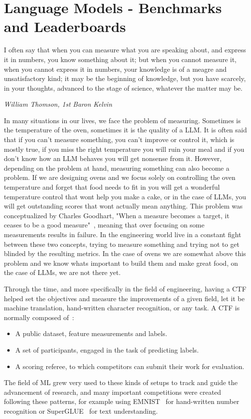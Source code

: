 \section{Language Models - Benchmarks and Leaderboards}\label{sec:b}


\epigraph{I often say that when you can measure what you are speaking about, and express it in numbers, you know something about it; but when you cannot measure it, when you cannot express it in numbers, your knowledge is of a meagre and unsatisfactory kind; it may be the beginning of knowledge, but you have scarcely, in your thoughts, advanced to the stage of science, whatever the matter may be.}{\textit{William Thomson, 1st Baron Kelvin}}

In many situations in our lives, we face the problem of measuring. Sometimes is the temperature of the oven, sometimes it is the quality of a \gls{LLM}. It is often said that if you can't measure something, you can't improve or control it, which is mostly true, if you miss the right temperature you will ruin your meal and if you don't know how an \gls{LLM} behaves you will get nonsense from it. 
However, depending on the problem at hand, measuring something can also become a problem. If we are designing ovens and we focus solely on controlling the oven temperature and forget that food needs to fit in you will get a wonderful temperature control that wont help you make a cake, or in the case of \glspl{LLM}, you will get outstanding scores that wont actually mean anything. This problem was conceptualized by Charles Goodhart, "When a measure becomes a target, it ceases to be a good measure"~\cite{strathern1997improving}, meaning that over focusing on some measurements results in failure.
In the engineering world live in a constant fight between these two concepts, trying to measure something and trying not to get blinded by the resulting metrics. In the case of ovens we are somewhat above this problem and we know whats important to build them and make great food, on the case of \glspl{LLM}, we are not there yet.


Through the time, and more specifically in the field of engineering, having a \gls{CTF} helped set the objectives and measure the improvements of a given field, let it be machine translation, hand-written character recognition, or any task. A \gls{CTF} is normally composed of~\cite{donoho201750}:
\begin{itemize}
    \item A public dataset, feature measurements and labels.
    \item A set of participants, engaged in the task of predicting labels.
    \item A scoring referee, to which competitors can submit their work for evaluation.
\end{itemize}
The field of \gls{ML} grew very used to these kinds of setups to track and guide the advancement of research, and many important competitions were created following these patterns, for example using EMNIST~\cite{cohen2017emnist} for hand-written number recognition or SuperGLUE~\cite{wang2019superglue} for text understanding.

